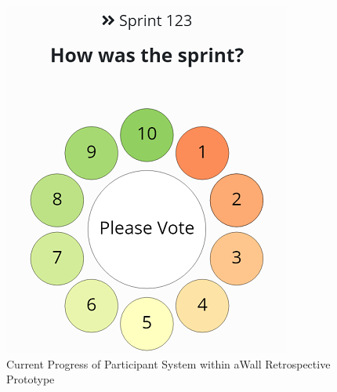 \begin{itemize}
\begin{figure}[ht]
\includegraphics{participant_progress}
\centering
\caption{Current Progress of Participant System within aWall Retrospective Prototype} \label{fig:parProgress}
\end{figure}
\end{itemize}

